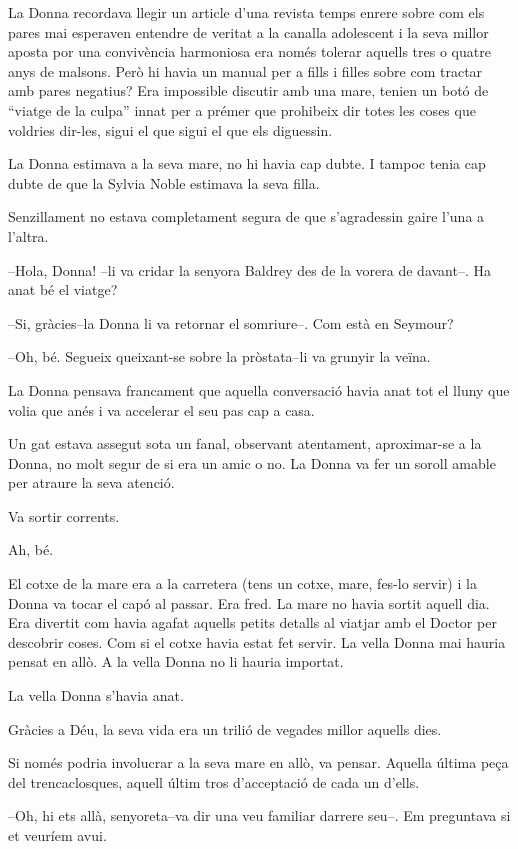 La Donna recordava llegir un article d'una revista temps enrere sobre
com els pares mai esperaven entendre de veritat a la canalla adolescent
i la seva millor aposta por una convivència harmoniosa era només tolerar
aquells tres o quatre anys de malsons. Però hi havia un manual per a
fills i filles sobre com tractar amb pares negatius? Era impossible
discutir amb una mare, tenien un botó de ``viatge de la culpa'' innat
per a prémer que prohibeix dir totes les coses que voldries dir-les,
sigui el que sigui el que els diguessin.

La Donna estimava a la seva mare, no hi havia cap dubte. I tampoc tenia
cap dubte de que la Sylvia Noble estimava la seva filla.

Senzillament no estava completament segura de que s'agradessin gaire
l'una a l'altra.

--Hola, Donna! --li va cridar la senyora Baldrey des de la vorera de
davant--. Ha anat bé el viatge?

--Si, gràcies--la Donna li va retornar el somriure--. Com està en
Seymour?

--Oh, bé. Segueix queixant-se sobre la pròstata--li va grunyir la veïna.

La Donna pensava francament que aquella conversació havia anat tot el
lluny que volia que anés i va accelerar el seu pas cap a casa.

Un gat estava assegut sota un fanal, observant atentament, aproximar-se
a la Donna, no molt segur de si era un amic o no. La Donna va fer un
soroll amable per atraure la seva atenció.

Va sortir corrents.

Ah, bé.

El cotxe de la mare era a la carretera (tens un cotxe, mare, fes-lo
servir) i la Donna va tocar el capó al passar. Era fred. La mare no
havia sortit aquell dia. Era divertit com havia agafat aquells petits
detalls al viatjar amb el Doctor per descobrir coses. Com si el cotxe
havia estat fet servir. La vella Donna mai hauria pensat en allò. A la
vella Donna no li hauria importat.

La vella Donna s'havia anat.

Gràcies a Déu, la seva vida era un trilió de vegades millor aquells
dies.

Si només podria involucrar a la seva mare en allò, va pensar. Aquella
última peça del trencaclosques, aquell últim tros d'acceptació de cada
un d'ells.

--Oh, hi ets allà, senyoreta--va dir una veu familiar darrere seu--. Em
preguntava si et veuríem avui.

